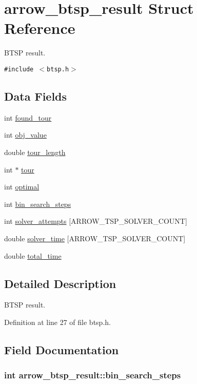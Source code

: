 \hypertarget{structarrow__btsp__result}{
\section{arrow\_\-btsp\_\-result Struct Reference}
\label{structarrow__btsp__result}
}
BTSP result.  


{\tt \#include $<$btsp.h$>$}

\subsection*{Data Fields}
\begin{CompactItemize}
\item 
int \hyperlink{structarrow__btsp__result_6ba21b4231cfe2c1e437a9f7e8f31aa6}{found\_\-tour}
\item 
int \hyperlink{structarrow__btsp__result_ea5f7f45bf61f33ca6b57829da92e041}{obj\_\-value}
\item 
double \hyperlink{structarrow__btsp__result_3c0b8827a873df71166e7fe9419c45c2}{tour\_\-length}
\item 
int $\ast$ \hyperlink{structarrow__btsp__result_ebd9a553dc3bf31f52eda0b293b0e272}{tour}
\item 
int \hyperlink{structarrow__btsp__result_febcf61e24bf277eeb7795c18bd42b8b}{optimal}
\item 
int \hyperlink{structarrow__btsp__result_80106c5f0b8f82353ad6771ad9eaac71}{bin\_\-search\_\-steps}
\item 
int \hyperlink{structarrow__btsp__result_b1d423ab6eda81de4c3bde1685976593}{solver\_\-attempts} \mbox{[}ARROW\_\-TSP\_\-SOLVER\_\-COUNT\mbox{]}
\item 
double \hyperlink{structarrow__btsp__result_f13227603570821a0ba7d6466f39f00c}{solver\_\-time} \mbox{[}ARROW\_\-TSP\_\-SOLVER\_\-COUNT\mbox{]}
\item 
double \hyperlink{structarrow__btsp__result_dea5711f0a574d98f66d1b20011a68de}{total\_\-time}
\end{CompactItemize}


\subsection{Detailed Description}
BTSP result. 

Definition at line 27 of file btsp.h.

\subsection{Field Documentation}
\hypertarget{structarrow__btsp__result_80106c5f0b8f82353ad6771ad9eaac71}{
\subsubsection[{bin\_\-search\_\-steps}]{\setlength{\rightskip}{0pt plus 5cm}int {\bf arrow\_\-btsp\_\-result::bin\_\-search\_\-steps}}}
\label{structarrow__btsp__result_80106c5f0b8f82353ad6771ad9eaac71}


